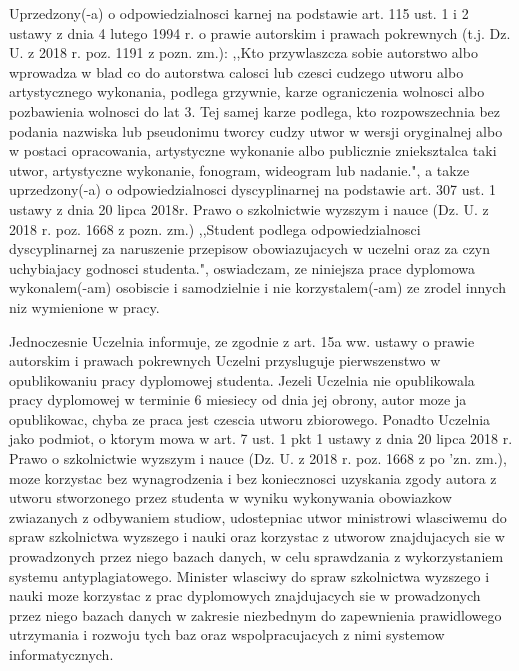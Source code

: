 \documentclass[a4paper,12pt]{book}
\begin{document}
{%
{Uprzedzony(-a) o odpowiedzialnosci karnej na podstawie art. 115 ust. 1 i 2 ustawy z dnia 4 lutego 1994 r. o prawie autorskim i prawach pokrewnych (t.j. Dz. U. z 2018 r. poz. 1191 z pozn. zm.): ,,Kto przywlaszcza sobie autorstwo albo wprowadza w blad co do autorstwa calosci lub czesci cudzego utworu albo artystycznego wykonania, podlega grzywnie, karze ograniczenia wolnosci albo pozbawienia wolnosci do lat 3. Tej samej karze podlega, kto rozpowszechnia bez podania nazwiska lub pseudonimu tworcy cudzy utwor w wersji oryginalnej albo w postaci opracowania, artystyczne wykonanie albo publicznie znieksztalca taki utwor, artystyczne wykonanie, fonogram, wideogram lub nadanie.", a takze uprzedzony(-a) o odpowiedzialnosci dyscyplinarnej na podstawie art. 307 ust. 1 ustawy z dnia 20 lipca 2018r. Prawo o szkolnictwie wyzszym i nauce (Dz. U. z 2018 r. poz. 1668 z pozn. zm.) ,,Student podlega odpowiedzialnosci dyscyplinarnej za naruszenie przepisow obowiazujacych w uczelni oraz za czyn uchybiajacy godnosci studenta.", oswiadczam, ze niniejsza prace dyplomowa wykonalem(-am) osobiscie i samodzielnie i nie korzystalem(-am) ze zrodel innych niz wymienione w pracy.

\bigskip

Jednoczesnie Uczelnia informuje, ze zgodnie z art. 15a ww. ustawy o prawie autorskim i prawach pokrewnych Uczelni przysluguje pierwszenstwo w opublikowaniu pracy dyplomowej studenta. Jezeli Uczelnia nie opublikowala pracy dyplomowej w terminie 6 miesiecy od dnia jej obrony, autor moze ja opublikowac, chyba ze praca jest czescia utworu zbiorowego. Ponadto Uczelnia jako podmiot, o ktorym mowa w art. 7 ust. 1 pkt 1 ustawy z dnia 20 lipca 2018 r. Prawo o szkolnictwie wyzszym i nauce (Dz. U. z 2018 r. poz. 1668 z po 'zn. zm.), moze korzystac bez wynagrodzenia i bez koniecznosci uzyskania zgody autora z utworu stworzonego przez studenta w wyniku wykonywania obowiazkow zwiazanych z odbywaniem studiow, udostepniac utwor ministrowi wlasciwemu do spraw szkolnictwa wyzszego i nauki oraz korzystac z utworow znajdujacych sie w prowadzonych przez niego bazach danych, w celu sprawdzania z wykorzystaniem systemu antyplagiatowego. Minister wlasciwy do spraw szkolnictwa wyzszego i nauki moze korzystac z prac dyplomowych znajdujacych sie w prowadzonych przez niego bazach danych w zakresie niezbednym do zapewnienia prawidlowego utrzymania i rozwoju tych baz oraz wspolpracujacych z nimi systemow informatycznych.}\\

}
\end{document}
